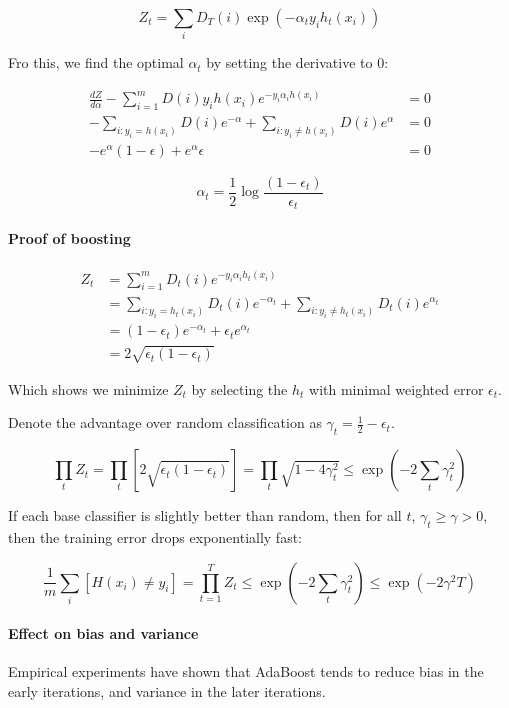 \documentclass{idc_msc}
\begin{document}
\[Z_t = \sum_i D_T(i) \exp(-\alpha_t y_i h_t(x_i))\]

Fro this, we find the optimal \(\alpha_t\) by setting the derivative to 0:

\[
\begin{aligned}
\frac{dZ}{d\alpha} - \sum_{i=1}^m D(i) y_i h(x_i) e^{-y_i \alpha_i h(x_i)} &= 0 \\
- \sum_{i : y_i = h(x_i)} D(i) e^{-\alpha} + \sum_{i : y_i \ne h(x_i)} D(i) e^{\alpha} &= 0 \\
-e^{\alpha} (1-\epsilon) + e^\alpha \epsilon &= 0
\end{aligned}
\]

\[
  \alpha_t = \frac{1}{2}\log\frac{(1-\epsilon_t)}{\epsilon_t}
\]

\paragraph{Proof of boosting}

\[
\begin{aligned}
Z_t &= \sum_{i=1}^m D_t(i) e^{-y_i \alpha_i h_t(x_i)} \\
&= \sum_{i : y_i = h_t(x_i)} D_t(i) e^{-\alpha_t} + \sum_{i : y_i \ne h_t(x_i)} D_t(i) e^{\alpha_t} \\
&= (1-\epsilon_t)e^{-\alpha_t} + \epsilon_t e^{\alpha_t} \\
&= 2 \sqrt{\epsilon_t(1-\epsilon_t)}
\end{aligned}
\]

Which shows we minimize \(Z_t\) by selecting the \(h_t\) with minimal weighted error \(\epsilon_t\).

Denote the advantage over random classification as \(\gamma_t = \frac{1}{2}-\epsilon_t\).

\[
\prod_t Z_t
= \prod_t \left[2 \sqrt{\epsilon_t(1-\epsilon_t)}\right]
= \prod_t \sqrt{1-4\gamma_t^2}
\le \exp\left(-2\sum_t \gamma^2_t\right)
\]

If each base classifier is slightly better than random, then for all \(t\), \(\gamma_t \ge \gamma > 0\), then the training error drops exponentially fast:

\[
\frac{1}{m}\sum_i \left[H(x_i) \ne y_i\right]
= \prod_{t=1}^T Z_t
\le \exp\left(-2\sum_t \gamma_t^2\right)
\le \exp(-2 \gamma^2 T)
\]

\paragraph{Effect on bias and variance}

Empirical experiments have shown that AdaBoost tends to reduce bias in the early iterations, and variance in the later iterations.
\end{document}
